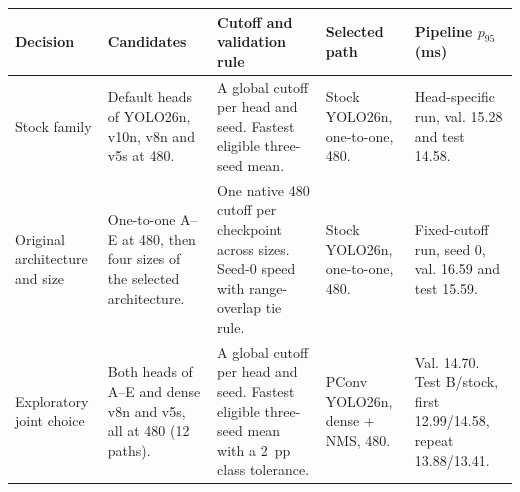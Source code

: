 \begin{tabular}{@{}p{}p{}p{}p{}p{}@{}}\hline
Decision & Candidates & Cutoff and validation rule & Selected path & Pipeline $p_{95}$ (ms) \\ \hline
Stock family & Default heads of YOLO26n, v10n, v8n and v5s at 480. & A global cutoff per head and seed. Fastest eligible three-seed mean. & Stock YOLO26n, one-to-one, 480. & Head-specific run, val. 15.28 and test 14.58. \\
Original architecture and size & One-to-one A--E at 480, then four sizes of the selected architecture. & One native 480 cutoff per checkpoint across sizes. Seed-0 speed with range-overlap tie rule. & Stock YOLO26n, one-to-one, 480. & Fixed-cutoff run, seed 0, val. 16.59 and test 15.59. \\
Exploratory joint choice & Both heads of A--E and dense v8n and v5s, all at 480 (12 paths). & A global cutoff per head and seed. Fastest eligible three-seed mean with a 2~pp class tolerance. & PConv YOLO26n, dense + NMS, 480. & Val. 14.70. Test B/stock, first 12.99/14.58, repeat 13.88/13.41. \\
\hline\end{tabular}
